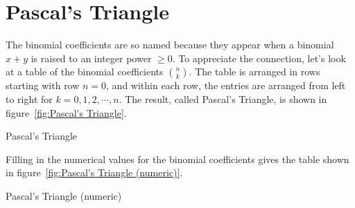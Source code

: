 \section{Pascal's Triangle}
The binomial coefficients are so named because they appear when a binomial $x+y$ is raised
to an integer power $\geq 0$. 
To appreciate the connection, let's look at a table of the binomial coefficients $\displaystyle {n\choose k}$.
The table is arranged in rows starting with row $n=0$, and within each row, the entries
are arranged from left to right for $k=0,1,2,\cdots,n$.
The result, called Pascal's Triangle,  is shown in figure~\ref{fig:Pascal's Triangle}.
\begin{marginfigure}
\centering
{}\caption{Pascal's Triangle}\label{fig:Pascal's Triangle}
\end{marginfigure}

Filling in  the numerical values for the binomial coefficients gives the table shown in
figure~\ref{fig:Pascal's Triangle (numeric)}.
\begin{marginfigure}
\centering
{}\caption{Pascal's Triangle (numeric)}\label{fig:Pascal's Triangle (numeric)}
\end{marginfigure}


